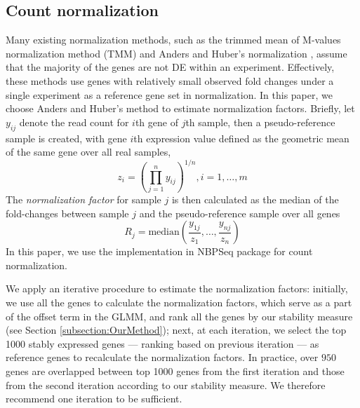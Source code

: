 \documentclass[11pt, a4paper]{article}
\begin{document}

\subsection{Count normalization}\label{section:countNormalization}

Many existing normalization methods, such as the trimmed mean of M-values normalization method (TMM) \citep{robinson2010scaling} and Anders and Huber's normalization \citep{anders2010differential}, assume that the majority of the genes are not DE within an experiment. Effectively, these methods use genes with relatively small observed fold changes under a single experiment as a reference gene set in normalization. In this paper, we choose Anders and Huber's method \citep{anders2010differential} to estimate normalization factors.  Briefly, let $y_{ij}$ denote the read count for $i$th gene of $j$th sample, then a pseudo-reference sample is created, with gene $i$th expression value defined as the geometric mean of the same gene over all real samples, 
\[ z_i = (\prod_{j=1}^ny_{ij})^{1/n},  i=1, \ldots, m \]
 The \textit{normalization factor} for sample $j$ is then calculated as the median of the fold-changes between sample $j$ and the pseudo-reference sample over all genes
  \begin{equation}\label{eq:normfactors} 
 R_j = \text{median}(\dfrac{y_{1j}}{z_1}, \ldots, \dfrac{y_{nj}}{z_n})
  \end{equation}
In this paper, we use the implementation in NBPSeq package \citep{di2014package} for count normalization. 

We apply an iterative procedure to estimate the normalization factors: initially, we use all the genes to calculate the normalization factors, which serve as a part of the offset term in the GLMM, and rank all the genes by our stability measure (see Section \ref{subsection:OurMethod}); next, at each iteration, we select the top 1000 stably expressed genes ---  ranking based on previous iteration --- as reference genes to recalculate the normalization factors. In practice, over $950$ genes are overlapped between top 1000 genes from the first iteration and those from the second iteration according to our stability measure. We therefore recommend one iteration to be sufficient.  
\end{document}
